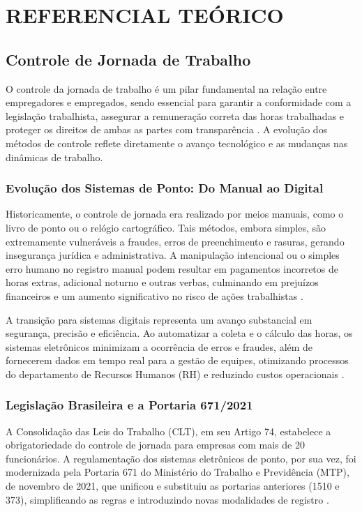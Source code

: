 \chapter{REFERENCIAL TEÓRICO}
\label{cha:referencial-teorico}

\section{Controle de Jornada de Trabalho}
\par O controle da jornada de trabalho é um pilar fundamental na relação entre empregadores e empregados, sendo essencial para garantir a conformidade com a legislação trabalhista, assegurar a remuneração correta das horas trabalhadas e proteger os direitos de ambas as partes com transparência \cite{compareplanodesaude}. A evolução dos métodos de controle reflete diretamente o avanço tecnológico e as mudanças nas dinâmicas de trabalho.

\subsection{Evolução dos Sistemas de Ponto: Do Manual ao Digital}
\par Historicamente, o controle de jornada era realizado por meios manuais, como o livro de ponto ou o relógio cartográfico. Tais métodos, embora simples, são extremamente vulneráveis a fraudes, erros de preenchimento e rasuras, gerando insegurança jurídica e administrativa. A manipulação intencional ou o simples erro humano no registro manual podem resultar em pagamentos incorretos de horas extras, adicional noturno e outras verbas, culminando em prejuízos financeiros e um aumento significativo no risco de ações trabalhistas \cite{RiscosPontoManual}.

\par A transição para sistemas digitais representa um avanço substancial em segurança, precisão e eficiência. Ao automatizar a coleta e o cálculo das horas, os sistemas eletrônicos minimizam a ocorrência de erros e fraudes, além de fornecerem dados em tempo real para a gestão de equipes, otimizando processos do departamento de Recursos Humanos (RH) e reduzindo custos operacionais \cite{VantagensPontoDigital}.

\subsection{Legislação Brasileira e a Portaria 671/2021}
\par A Consolidação das Leis do Trabalho (CLT), em seu Artigo 74, estabelece a obrigatoriedade do controle de jornada para empresas com mais de 20 funcionários. A regulamentação dos sistemas eletrônicos de ponto, por sua vez, foi modernizada pela Portaria 671 do Ministério do Trabalho e Previdência (MTP), de novembro de 2021, que unificou e substituiu as portarias anteriores (1510 e 373), simplificando as regras e introduzindo novas modalidades de registro \cite{Portaria671Contabeis}.

